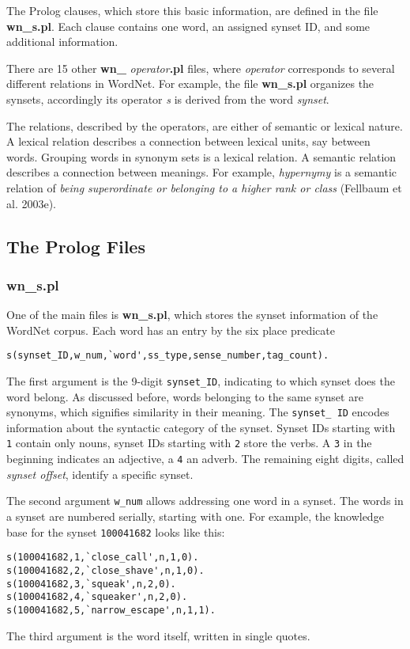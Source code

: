 \documentclass[12pt]{article}
\begin{document}
The Prolog clauses, which store this basic information, are defined in the file {\bfseries wn\_s.pl}. Each clause contains one word,
an assigned synset ID, and some additional information.

There are 15 other {\bfseries wn\_} \emph{operator}{\bfseries .pl} files,
where \emph{operator} corresponds to several different relations in WordNet. For example, the file
{\bfseries wn\_s.pl} organizes the synsets, accordingly its operator \emph{s} is derived from the word \emph{synset}.

The relations, described by the operators, are either of semantic or lexical nature. A lexical relation
describes a connection between lexical units, say between words. Grouping words in synonym sets
is a lexical relation. A semantic relation describes a connection between meanings.
For example, \emph{hypernymy} is a semantic relation of \emph{being superordinate or belonging to a higher rank or class}
(Fellbaum et al. 2003e).

\subsection{The Prolog Files}

\subsubsection{wn\_s.pl}

One of the main files is {\bfseries wn\_s.pl}, which stores the synset information of the WordNet corpus.
Each word has an entry by the six place predicate
\begin{verbatim}
s(synset_ID,w_num,`word',ss_type,sense_number,tag_count).
\end{verbatim}
The first argument is the 9-digit {\tt synset\_ID}, indicating to which synset does the word belong. As discussed before,
words belonging to the same synset are synonyms, which signifies similarity in their meaning.
The {\tt synset\_ ID} encodes information about the syntactic category of the synset.
Synset IDs starting with {\tt 1} contain only nouns, synset IDs starting with {\tt 2} store the verbs.
A {\tt 3} in the beginning indicates an adjective, a {\tt 4} an adverb. The remaining eight
digits, called \emph{synset offset}, identify a specific synset.

The second argument {\tt w\_num} allows addressing one word in a synset.
The words in a synset are numbered serially, starting
with one. For example, the knowledge base for the synset {\tt 100041682} looks like this:
\begin{verbatim}
s(100041682,1,`close_call',n,1,0).
s(100041682,2,`close_shave',n,1,0).
s(100041682,3,`squeak',n,2,0).
s(100041682,4,`squeaker',n,2,0).
s(100041682,5,`narrow_escape',n,1,1).
\end{verbatim}
The third argument is the word itself, written in single quotes.
\end{document}

